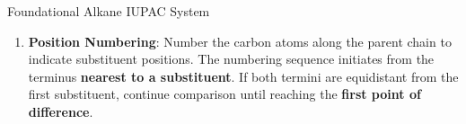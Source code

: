 \documentclass[10pt]{article}
\begin{document}
\begin{core}[label=core:alkane_iupac]{Foundational Alkane IUPAC System}
\begin{enumerate}[label=(\arabic*)]
\begin{enumerate}
            \vspace{-1cm}

          \end{enumerate}

          \item \textbf{Position Numbering}: Number the carbon atoms along the parent chain to indicate substituent positions. The numbering sequence initiates from the terminus \textbf{nearest to a substituent}. If both termini are equidistant from the first substituent, continue comparison until reaching the \textbf{first point of difference}.


\end{enumerate}
\end{core}
\end{document}
